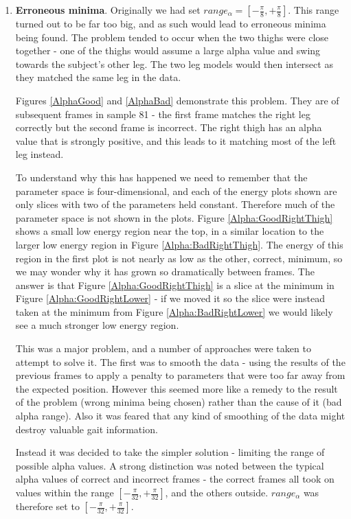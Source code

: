 \begin{enumerate}
	\item \textbf{Erroneous minima}.
		Originally we had set $range_\alpha = \left[ -\frac{\pi}{8}, +\frac{\pi}{8}\right]$.
		This range turned out to be far too big, and as such would lead to erroneous minima being found.
		The problem tended to occur when the two thighs were close together - one of the thighs would assume
		a large alpha value and swing towards the subject's other leg.
		The two leg models would then intersect as they matched the same leg in the data.
		
		Figures \ref{AlphaGood} and \ref{AlphaBad} demonstrate this problem.
		They are of subsequent frames in sample 81 - the first frame matches the right leg correctly
		but the second frame is incorrect.
		The right thigh has an alpha value that is strongly positive, and this leads to it matching most of the left leg instead.
		
		To understand why this has happened we need to remember that the parameter space is four-dimensional, and each of the energy plots
		shown are only slices with two of the parameters held constant.
		Therefore much of the parameter space is not shown in the plots.
		Figure \ref{Alpha:GoodRightThigh} shows a small low energy region near the top, in a similar location to the larger low energy region in Figure \ref{Alpha:BadRightThigh}.
		The energy of this region in the first plot is not nearly as low as the other, correct, minimum, so we may wonder why it has grown so dramatically between frames.
		The answer is that Figure \ref{Alpha:GoodRightThigh} is a slice at the minimum in Figure \ref{Alpha:GoodRightLower} - if we moved it so the slice
		were instead taken at the minimum from Figure \ref{Alpha:BadRightLower} we would likely see a much stronger low energy region.
		
		This was a major problem, and a number of approaches were taken to attempt to solve it.
		The first was to smooth the data - using the results of the previous frames to apply a penalty to parameters that were too far away from the expected position.
		However this seemed more like a remedy to the result of the problem (wrong minima being chosen) rather than the cause of it (bad alpha range).
		Also it was feared that any kind of smoothing of the data might destroy valuable gait information.
		
		Instead it was decided to take the simpler solution - limiting the range of possible alpha values.
		A strong distinction was noted between the typical alpha values of correct and incorrect frames - the correct frames all took on
		values within the range $\left[ -\frac{\pi}{32}, +\frac{\pi}{32}\right]$, and the others outside.
		$range_\alpha$ was therefore set to $\left[ -\frac{\pi}{32}, +\frac{\pi}{32}\right]$.
	

\end{enumerate}
